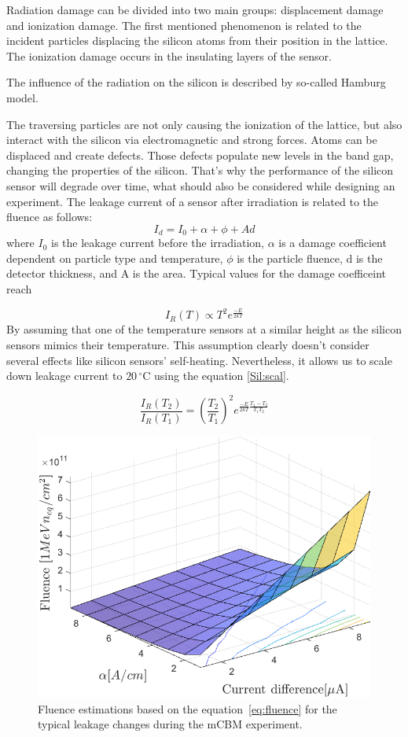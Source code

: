 Radiation damage can be divided into two main groups: displacement damage and ionization damage. The first mentioned phenomenon is related to the incident particles displacing the silicon atoms from their position in the lattice. The ionization damage occurs in the insulating layers of the sensor. 

The influence of the radiation on the silicon is described by so-called Hamburg model. 

The traversing particles are not only causing the ionization of the lattice, but also interact with the silicon via electromagnetic and strong forces. Atoms can be displaced and create defects. Those defects populate new levels in the band gap, changing the properties of the silicon. That’s why the performance of the silicon sensor will degrade over time, what should also be considered while designing an experiment. The leakage current of a sensor after irradiation is related to the fluence as follows:
\begin{equation}
\label{eq:fluence}
    I_{d} = I_{0} + \alpha + \phi + Ad
\end{equation}
where $I_{0}$ is the leakage current before the irradiation, $\alpha$ is a damage coefficient dependent on particle type and temperature, $\phi$ is the particle fluence, d is the detector thickness, and A is the area. 
Typical values for the damage coefficeint reach 


\begin{equation}
\label{Sil:temp}
    I_{R}(T) \propto T^{2}e^{\frac{-E}{2kT}}
\end{equation}
 By assuming that one of the  temperature sensors at a similar height as the silicon sensors mimics their temperature. This assumption clearly doesn't consider several effects like silicon sensors' self-heating. Nevertheless, it allows us to scale down leakage current to $20\,^{\circ}$C using the equation \ref{Sil:scal}.
 
\begin{equation}
\label{Sil:scal}
    \frac{I_{R}(T_{2})}{I_{R}(T_{1})} = (\frac{T_{2}}{T_{1}})^{2}e^{\frac{-E}{2kT}\frac{T_{1}-T_{2}}{T_{1}T_{2}}}
\end{equation}

\begin{figure}[!h]
\centering
\includegraphics[width=0.65\columnwidth]{Chapter2/images/Leakage_current.png}
\caption{Fluence estimations based on the equation~\ref{eq:fluence} for the typical leakage changes during the \gls{mCBM} experiment.}
\label{fig_leakage}
\end{figure}

